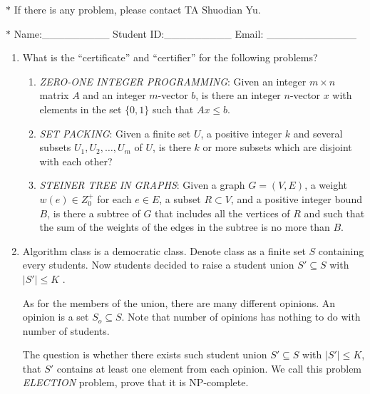 \documentclass[12pt,a4paper]{article}
\makeatletter
\newtheorem*{solution}{Solution}
\theoremstyle{definition}
\renewenvironment{solution}[1][Solution] {\par\pushQED{\qed}\normalfont\topsep6\p@\@plus6\p@\relax\trivlist\item[\hskip\labelsep\bfseries#1\@addpunct{.}]\ignorespaces}{\popQED\endtrivlist\@endpefalse} \makeatother
\makeatother
\begin{document}
\noindent

\noindent{}
\begin{center}
\footnotesize{\color{red}$*$ If there is any problem, please contact TA Shuodian Yu. }

\footnotesize{\color{blue}$*$ Name:\_\_\_\_\_\_\_\_\_  \quad Student ID:\_\_\_\_\_\_\_\_\_ \quad Email: \_\_\_\_\_\_\_\_\_\_\_\_}
\end{center}
\begin{enumerate}
	\item What is the ``certificate'' and ``certifier'' for the following problems?
	\begin{enumerate}
		\item \emph{ZERO-ONE INTEGER PROGRAMMING}: Given an integer $m \times n$ matrix $A$ and an integer $m$-vector $b$, is there an integer $n$-vector $x$ with elements in the set $\{0, 1\}$ such that $Ax \leq b$.
		\item \emph{SET PACKING}: Given a finite set $U$, a positive integer $k$ and several subsets $U_1, U_2, \ldots, U_m$ of $U$, is there $k$ or more subsets which are disjoint with each other?
		\item \emph{STEINER TREE IN GRAPHS}: Given a graph $G=(V,E)$, a weight $w(e)\in Z_0^{+}$ for each $e\in E$, a subset $R \subset V$, and a positive integer bound $B$, is there a subtree of $G$ that includes all the vertices of $R$ and such that the sum of the weights of the edges in the subtree is no more than $B$.
	\end{enumerate}

	\item Algorithm class is a democratic class. Denote class as a finite set $S$ containing every students. Now students decided to raise a student union $S' \subseteq S$ with $|S'|\leq K$ .
	
	As for the members of the union, there are many different opinions. An opinion is a set $S_o\subseteq S$. Note that number of opinions has nothing to do with number of students.
	
	The question is whether there exists such student union $S' \subseteq S$ with $|S'|\leq K$, that $S'$ contains at least one element from each opinion. We call this problem \emph{ELECTION} problem, prove that it is NP-complete.


\end{enumerate}
\end{document}
